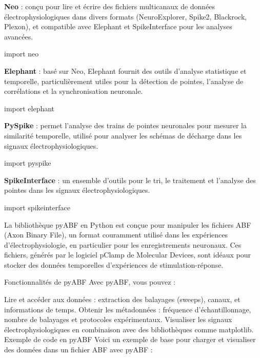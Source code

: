 \documentclass[a4paper,9pt]{extarticle}
\begin{document}
\begin{multicols}{2}




\textbf{Neo} : conçu pour lire et écrire des fichiers multicanaux de données électrophysiologiques dans divers formats (NeuroExplorer, Spike2, Blackrock, Plexon), et compatible avec Elephant et SpikeInterface pour les analyses avancées.
\begin{iplisting}
import neo
\end{iplisting}

\textbf{Elephant} : basé sur Neo, Elephant fournit des outils d'analyse statistique et temporelle, particulièrement utiles pour la détection de pointes, l'analyse de corrélations et la synchronisation neuronale.
\begin{iplisting}
import elephant
\end{iplisting}

\textbf{PySpike} : permet l'analyse des trains de pointes neuronales pour mesurer la similarité temporelle, utilisé pour analyser les schémas de décharge dans les signaux électrophysiologiques.
\begin{iplisting}
import pyspike
\end{iplisting}

\textbf{SpikeInterface} : un ensemble d'outils pour le tri, le traitement et l'analyse des pointes dans les signaux électrophysiologiques.
\begin{iplisting}
import spikeinterface
\end{iplisting}



La bibliothèque pyABF en Python est conçue pour manipuler les fichiers ABF (Axon Binary File), un format couramment utilisé dans les expériences d’électrophysiologie, en particulier pour les enregistrements neuronaux. Ces fichiers, générés par le logiciel pClamp de Molecular Devices, sont idéaux pour stocker des données temporelles d’expériences de stimulation-réponse.

Fonctionnalités de pyABF
Avec pyABF, vous pouvez :

Lire et accéder aux données : extraction des balayages (sweeps), canaux, et informations de temps.
Obtenir les métadonnées : fréquence d'échantillonnage, nombre de balayages et protocoles expérimentaux.
Visualiser les signaux électrophysiologiques en combinaison avec des bibliothèques comme matplotlib.
Exemple de code en pyABF
Voici un exemple de base pour charger et visualiser des données dans un fichier ABF avec pyABF :




\end{multicols}
\end{document}
